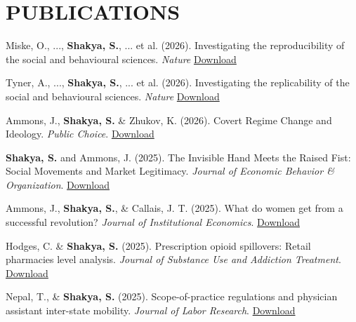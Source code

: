 \section*{PUBLICATIONS}
\begin{etaremune}
\item Miske, O., ...,  \textbf{Shakya, S.}, ... et al. (2026). Investigating the reproducibility of the social and behavioural sciences. \textit{Nature} \hfill \href{https://repository.essex.ac.uk/42891/1/SCOREreproducibility.fullmanuscript.pdf}{Download}

\item Tyner, A., ...,  \textbf{Shakya, S.}, ... et al. (2026). Investigating the replicability of the social and behavioural sciences. \textit{Nature} \hfill \href{https://osf.io/preprints/metaarxiv/b7x8f}{Download}

\item Ammons, J., \textbf{Shakya, S.} \& Zhukov, K. (2026). Covert Regime Change and Ideology. \textit{Public Choice}. \hfill \href{https://link.springer.com/article/10.1007/s11127-026-01382-w}{Download}


\item \textbf{Shakya, S.} and Ammons, J. (2025). The Invisible Hand Meets the Raised Fist: Social Movements and Market Legitimacy. \textit{Journal of Economic Behavior \& Organization}. \hfill \href{https://www.dropbox.com/scl/fi/gqvbgmgf2midszre44cyf/The-Invisible-Hand-Meets-the-Raised-Fist.pdf?rlkey=fg7jdpiv4w9xlw5tgoyl66j4s&st=0bttotm2&dl=0}{Download}


\item Ammons, J., \textbf{Shakya, S.}, \& Callais, J. T. (2025). What do women get from a successful revolution? \textit{Journal of Institutional Economics}. \hfill \href{https://www.dropbox.com/scl/fi/691ysf6zimszgb1b3wscz/what-do-women-get-from-a-successful-revolution.pdf?rlkey=1yebirjrvyaq7yl2jt8mdf0ob&st=5rhg36b8&dl=0}{Download}

\item Hodges, C. \& \textbf{Shakya, S.} (2025). Prescription opioid spillovers: Retail pharmacies level analysis. \textit{Journal of Substance Use and Addiction Treatment}. \hfill \href{https://www.dropbox.com/scl/fi/sto4f3852u4mbzur56ih1/Prescription-opioid-spillovers_-Retail-pharmacy-level-analysis.pdf?rlkey=mb52o2583pgs17660hkd7d5ke&st=afw12tku&dl=0}{Download}

\item Nepal, T., \& \textbf{Shakya, S.} (2025). Scope-of-practice regulations and physician assistant inter-state mobility. \textit{Journal of Labor Research}. \hfill \href{https://www.dropbox.com/scl/fi/tqgnrk9fxrvznrlokdhmk/Shakya-Scope-of-Practice-Regulations-and-Physician-Assistant-Inter-State-Practice-Relocation.pdf?rlkey=usoy1gpnm952ocwktug0tcoac&st=ahe0oxz0&dl=0}{Download}


\end{etaremune}
